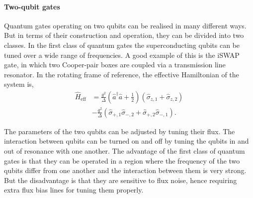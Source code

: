\paragraph{Two-qubit gates}

Quantum gates operating on two qubits can be realised in many different ways. But in terms of their construction and operation, they can be divided into two classes. In the first class of quantum gates the superconducting qubits can be tuned over a wide range of frequencies. A good example of this is the iSWAP gate, in which two Cooper-pair boxes are coupled via a transmission line resonator. In the rotating frame of reference, the effective Hamiltonian of the system is,
\begin{align}
\hat{H}_\mathrm{eff} &= \frac{g^{2}}{\Delta} \left( \hat{a}^{\dag} \hat{a} + \frac{1}{2} \right) (\hat\sigma_{z,1} + \hat\sigma_{z,2}) \nonumber\\
&- \frac{g^{2}}{\Delta} (\hat\sigma_{+,1} \hat\sigma_{-,2} + \hat\sigma_{+,2} \hat\sigma_{-,1}).
\end{align}

The parameters of the two qubits can be adjusted by tuning their flux. The interaction between qubits can be turned on and off by tuning the qubits in and out of resonance with one another. The advantage of the first class of quantum gates is that they can be operated in a region where the frequency of the two qubits differ from one another and the interaction between them is very strong. But the disadvantage is that they are sensitive to flux noise, hence requiring extra flux bias lines for tuning them properly.

